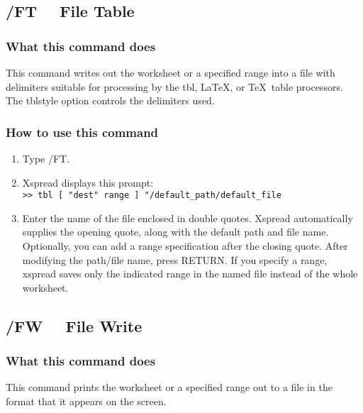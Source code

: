\subsection*{/FT \ \     File Table}

\subsubsection*{What this command does}
This command writes out the worksheet or a specified range into a file 
with delimiters suitable for processing by the tbl, \LaTeX, or
\TeX\  table processors.  The tblstyle option controls the delimiters used.

\subsubsection*{How to use this command}
\begin{enumerate}
\item{Type /FT.}
\item{Xspread displays this prompt:\\
	\verb|>> tbl [ "dest" range ] "/default_path/default_file|\\}
\item{Enter the name of the file enclosed in double quotes.  Xspread
        automatically supplies the opening quote, along with the default
	path and file name. Optionally, you can add
        a range specification after the closing quote.  After modifying
        the path/file name, press RETURN.  If you specify a range, xspread
        saves only the indicated range in the named file instead of the
        whole worksheet.}
\end{enumerate}
        
\subsection*{/FW \ \     File Write}

\subsubsection*{What this command does}
This command prints the worksheet or a specified range out to a file 
in the format that it appears on the screen.

